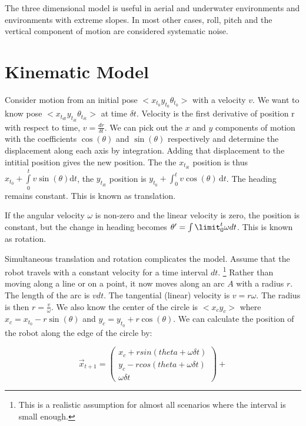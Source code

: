 \documentclass[12pt]{report}
\begin{document}
The three dimensional model
is useful in aerial and underwater environments and environments with
extreme slopes.  In most other cases, roll, pitch and the vertical
component of motion are considered systematic noise.

\section{Kinematic Model}

Consider motion from an initial pose $<x_{t_0} y_{t_0}\theta_{t_0}>$
with a velocity $v$. We want to know pose $<x_{t_{dt}} y_{t_{\delta t}}
\theta_{t_{\delta t}}>$ at time $\delta t$. Velocity is the first derivative of
position r with respect to time, $v = \frac{dr}{\delta t}$. We can pick out
the $x$ and $y$ components of motion with the coefficients $\cos
(\theta)$ and $\sin (\theta)$ respectively and determine the
displacement along each axis by integration. Adding that displacement
to the intitial position gives the new position. The the $x_{t_{\delta t}}$
position is thus $x_{t_0} + \int\limits_0^t v \sin (\theta) \mathrm{d}t$,
the $y_{t_{\delta t}}$ position is $y_{t_0} + \int_0^t \! v \cos (\theta) \,
\mathrm{d}t$. The heading remains constant. This is known as translation.

If the angular velocity $\omega$ is non-zero and the linear velocity is
zero, the position is constant, but the change in heading becomes
$\theta' = \int\limit_0^t \omega dt$. This is known as rotation.

Simultaneous translation and rotation complicates the model. Assume
that the robot travels with a constant velocity for a time interval
$dt$. \footnote{This is a realistic assumption for almost all
  scenarios where the interval is small enough.}  Rather than moving
along a line or on a point, it now moves along an arc $A$ with a
radius $r$. The length of the arc is $vdt$. The tangential (linear)
velocity is $v = r\omega$.  The radius is then $r = \frac{v}{\omega}$.
We also know the center of the circle is $<x_c y_c>$ where $x_c = x_t_0 -
r \sin (\theta)$ and $y_c = y_t_0 + r \cos (\theta)$.  We can calculate
the position of the robot along the edge of the circle by:

\begin{equation}
\label{motion_model}
\vec{x}_{t+1}=
\begin{pmatrix}
  x_c + r sin(theta + \omega \delta t) \\
  y_c - r cos(theta + \omega \delta t) \\
  \omega \delta t
\end{pmatrix}  +
\end{equation}
\end{document}
